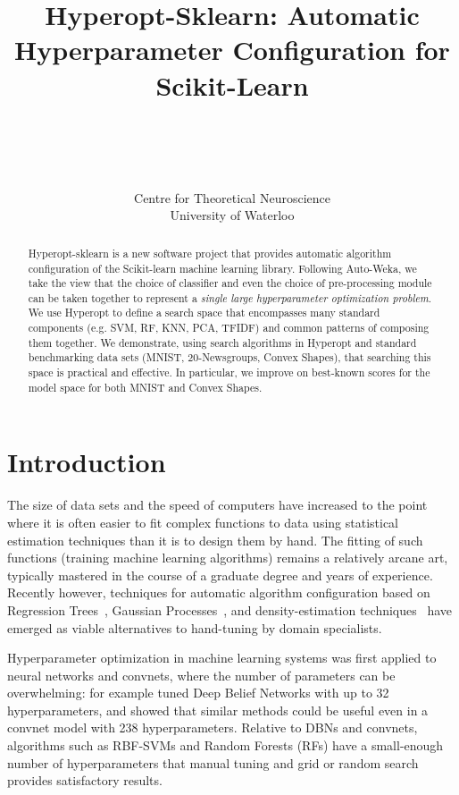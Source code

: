 \documentclass[wcp]{jmlr}
\title[Hyperopt-Sklearn]{Hyperopt-Sklearn: Automatic Hyperparameter Configuration for Scikit-Learn}
\author{
      \\
      \Name{Brent Komer} \Email{brent.komer@uwaterloo.ca}\\
      \Name{James Bergstra} \Email{james.bergstra@uwaterloo.ca}\\
      \Name{Chris Eliasmith} \Email{celiasmith@uwaterloo.ca}\\
      \addr Centre for Theoretical Neuroscience\\University of Waterloo\\
  }
\begin{document}
\maketitle

\begin{abstract}
    Hyperopt-sklearn is a new software project that provides automatic algorithm configuration of the Scikit-learn machine learning library.
    Following Auto-Weka, we take the view that the choice of classifier and even the choice of pre-processing module can be taken together to represent a {\em single large hyperparameter optimization problem}.
    We use Hyperopt to define a search space that encompasses many standard components (e.g. SVM, RF, KNN, PCA, TFIDF) and common patterns of composing them together.
    We demonstrate, using search algorithms in Hyperopt and standard benchmarking data sets (MNIST, 20-Newsgroups, Convex Shapes), that searching this space is practical and effective.
    In particular, we improve on best-known scores for the model space for both MNIST and Convex Shapes.
\end{abstract}

\section{Introduction}
\label{sec:intro}

The size of data sets and the speed of computers have increased to the point where it is often easier to fit complex functions to data using statistical estimation techniques than it is to design them by hand.
The fitting of such functions (training machine learning algorithms) remains a relatively arcane art, typically mastered in the course of a graduate degree and years of experience.
Recently however, techniques for automatic algorithm configuration based on
Regression Trees~\citep{hutter+hoos+leyton-brown:2011},
Gaussian Processes~\citep{MoTiZi78,snoek+larochelle+adams:2012nips},
and density-estimation techniques~\citep{bergstra+bardenet+bengio+kegl:2011}
have emerged as viable alternatives to hand-tuning by domain specialists.

Hyperparameter optimization in machine learning systems was first applied to neural networks and convnets, where the number of parameters can be overwhelming:
for example \citet{bergstra+bardenet+bengio+kegl:2011} tuned Deep Belief Networks with up to 32 hyperparameters,
and \citet{bergstra+yamins+cox:2013} showed that similar methods could be useful even in a convnet model with 238 hyperparameters.
Relative to DBNs and convnets, algorithms such as RBF-SVMs and Random Forests (RFs) have a small-enough number of hyperparameters that manual tuning and grid or random search provides satisfactory results.
\end{document}
